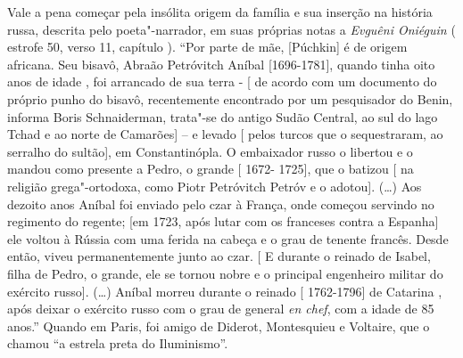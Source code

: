 Vale a pena começar pela insólita origem da família e sua inserção na
história russa, descrita pelo poeta"-narrador, em suas próprias notas a
\emph{Evguêni Oniéguin} ( estrofe 50, verso 11, capítulo ). ``Por parte
de mãe, {[}Púchkin{]} é de origem africana. Seu bisavô, Abraão
Petróvitch Aníbal {[}1696-1781{]}, quando tinha oito anos de idade , foi
arrancado de sua terra - {[} de acordo com um documento do próprio punho
do bisavô, recentemente encontrado por um pesquisador do Benin, informa
Boris Schnaiderman, trata"-se do antigo Sudão Central, ao sul do lago
Tchad e ao norte de Camarões{]} -- e levado {[} pelos turcos que o
sequestraram, ao serralho do sultão{]}, em Constantinópla. O embaixador
russo o libertou e o mandou como presente a Pedro, o grande {[} 1672-
1725{]}, que o batizou {[} na religião grega"-ortodoxa, como Piotr
Petróvitch Petróv e o adotou{]}. (\ldots{}) Aos dezoito anos Aníbal foi
enviado pelo czar à França, onde começou servindo no regimento do
regente; {[}em 1723, após lutar com os franceses contra a Espanha{]} ele
voltou à Rússia com uma ferida na cabeça e o grau de tenente francês.
Desde então, viveu permanentemente junto ao czar. {[} E durante o
reinado de Isabel, filha de Pedro, o grande, ele se tornou nobre e o
principal engenheiro militar do exército russo{]}. (\ldots{})  Aníbal
morreu durante o reinado {[} 1762-1796{]} de Catarina , após deixar o
exército russo com o grau de general \emph{en chef}, com a idade de 85
anos.'' Quando em Paris, foi amigo de Diderot, Montesquieu e Voltaire,
que o chamou ``a estrela preta do Iluminismo''.

